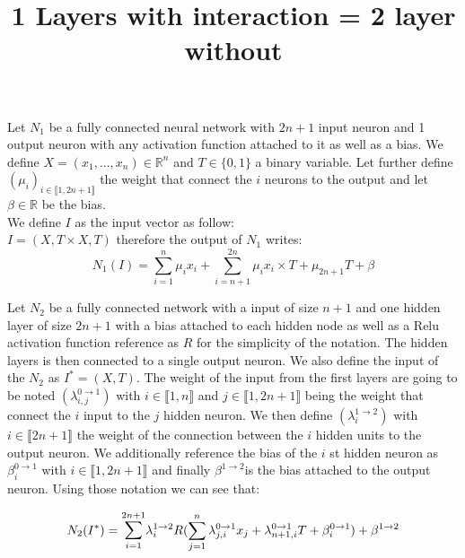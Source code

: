 \documentclass{article}
\title{1 Layers with interaction = 2 layer without}
\begin{document}
\maketitle

Let $N_1$ be a fully connected neural network with $2n+1$ input neuron and 1 output neuron with any activation function attached to it as well as a bias. We define $X = (x_1,...,x_n) \in \mathbb{R}^{n}$ and $T \in \{0,1\}$ a binary variable. Let further define $(\mu_{i})_{i \in  \llbracket 1,2n+1 \rrbracket }$ the weight that connect the $i$ neurons to the output and let $\beta \in \mathbb{R}$ be the bias.\\
We define $I$ as the input vector as follow:\\
$I=(X,T\times X,T)$ therefore the output of $N_1$ writes:\\
\begin{equation}
    N_1(I) = \sum_{i=1}^{n} \mu_{i}x_i + \sum_{i=n+1}^{2n} \mu_{i}x_i\times T+ \mu_{2n+1}T + \beta 
\end{equation}

Let $N_2$ be a fully connected network with a input of size $n+1$ and one hidden layer of size $2n+1$ with a bias attached to each hidden node as well as a Relu activation function reference as $R$ for the simplicity of the notation. The hidden layers is then connected to a single output neuron. We also define the input of the $N_2$ as $I^{*} = (X,T)$. The weight of the input from the first layers are going to be noted $(\lambda^{0 \rightarrow 1}_{i,j})$ with $i \in \llbracket 1,n \rrbracket$ and $j\in \llbracket1,2n+1 \rrbracket$ being the weight that connect the $i$ input to the $j$ hidden neuron. We then define $(\lambda^{1 \rightarrow 2}_{i})$ with $i \in \llbracket 2n+1 \rrbracket$ the weight of the connection between the $i$ hidden units to the output neuron. We additionally reference the bias of the $i$ st hidden neuron as $\beta^{0 \rightarrow 1}_{i}$ with $i \in \llbracket 1,2n+1 \rrbracket$ and finally $\beta^{1 \rightarrow 2}$is the bias attached to the output neuron. Using those notation we can see that:

\begin{equation}
    N_2(I^{*}) = \mathlarger{\sum}_{i=1}^{2n+1} \lambda^{1 \rightarrow 2}_{i} R( \sum_{j=1}^{n} \lambda^{0 \rightarrow 1}_{j,i} x_j +\lambda^{0 \rightarrow 1}_{n+1,i} T +\beta^{0 \rightarrow 1}_{i} ) +\beta^{1 \rightarrow 2} \label{eqN2}
\end{equation} 
\end{document}
